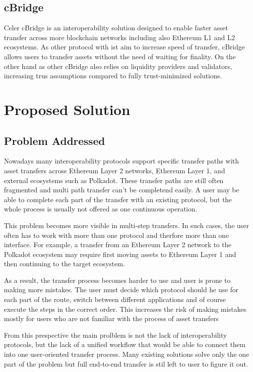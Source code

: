 \documentclass[conference]{IEEEtran}
\begin{document}
\subsection{cBridge}

Celer cBridge is an interoperability solution designed to enable faster asset transfer across more blockchain networks including also Ethereum L1 and L2 ecosystems. As other protocol with ist aim to increase speed of transfer, cBridge allows users to transfer assets without the need of waiting for finality. On the other hand as other cBridge also relies on liquidity providers and validators, increasing trus assumptions compared to fully trust-minimized solutions.\cite{celer}



\section{Proposed Solution}

\subsection{Problem Addressed}

Nowadays many interoperability protocols support specific transfer paths with asset transfers across Ethereum Layer 2 networks, Ethereum Layer 1, and external ecosystems such as Polkadot. These transfer paths are still often fragmented and multi path transfer can't be completend easily. A user may be able to complete each part of the transfer with an existing protocol, but the whole process is usually not offered as one continuous operation.

This problem becomes more visible in multi-step transfers. In such cases, the user often has to work with more than one protocol and therfore more than one interface. For example, a transfer from an Ethereum Layer 2 network to the Polkadot ecosystem may require first moving assets to Ethereum Layer 1 and then continuing to the target ecosystem. 

As a result, the transfer process becomes harder to use and user is prone to making more mistakes. The user must decide which protocol should he use for each part of the route, switch between different applications and of course execute the steps in the correct order. This increases the risk of making mistakes mostly for users who are not familiar with the process of asset transfers

From this prespective the main prolblem is not the lack of interoperability protocols, but the lack of a unified workflow that would be able to connect them into one user-oriented transfer process. Many existing solutions solve only the one part of the problem but full end-to-end transfer is stil left to user to figure it out.
\end{document}
